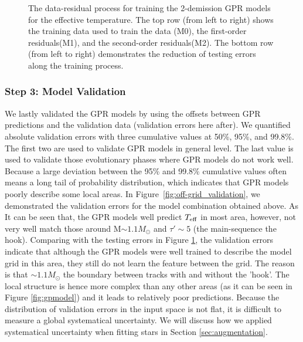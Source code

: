 \begin{figure}
    \caption{The data-residual process for training the 2-demission GPR models for the effective temperature. The top row (from left to right) shows the training data used to train the data (M0), the first-order residuals(M1), and the second-order residuals(M2). The bottom row (from left to right) demonstrates the reduction of testing errors along the training process.}  
    \label{fig:drprocess}
\end{figure}


\subsubsection{Step 3: Model Validation}

We lastly validated the GPR models by using the offsets between GPR predictions and the validation data (validation errors here after).  We quantified absolute validation errors with three cumulative values at 50\%, 95\%, and 99.8\%. The first two are used to validate GPR models in general level. The last value is used to validate those evolutionary phases where GPR models do not work well. Because a large deviation between the 95\% and 99.8\% cumulative values often means a long tail of probability distribution, which indicates that GPR models poorly describe some local areas. In Figure~\ref{fig:off-grid_validation}, we demonstrated the validation errors for the model combination obtained above. As It can be seen that, the GPR models well predict $T_{\rm eff}$ in most area, however, not very well match those around M$\sim1.1M_{\odot}$ and $\tau'\sim5$ (the main-sequence the hook). Comparing with the testing errors in Figure \ref{fig:drprocess}, the validation errors indicate that although the GPR models were well trained to describe the model grid in this area, they still do not learn the feature between the grid. The reason is that $\sim1.1M_{\odot}$ the boundary between tracks with and without the 'hook'. The local structure is hence more complex than any other areas (as it can be seen in Figure \ref{fig:gpmodel}) and it leads to relatively poor predictions. Because the distribution of validation errors in the input space is not flat, it is difficult to measure a global systematical uncertainty. We will discuss how we applied systematical uncertainty when fitting stars in Section \ref{sec:augmentation}. 
 
